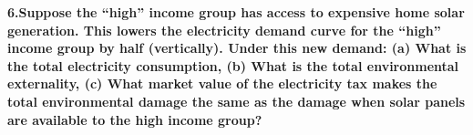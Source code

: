 \documentclass[
]{article}
\begin{document}
\textbf{6.Suppose the ``high'' income group has access to expensive home
solar generation. This lowers the electricity demand curve for the
``high'' income group by half (vertically). Under this new demand: (a)
What is the total electricity consumption, (b) What is the total
environmental externality, (c) What market value of the electricity tax
makes the total environmental damage the same as the damage when solar
panels are available to the high income group?}
\end{document}
